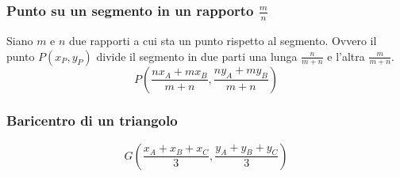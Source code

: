 \subsubsection{Punto su un segmento in un rapporto $\frac{m}{n}$}
Siano $m$ e $n$ due rapporti a cui sta un punto rispetto al segmento. Ovvero il punto $P(x_P, y_P)$
divide il segmento in due parti una lunga $\frac{n}{m+n}$ e l'altra $\frac{m}{m+n}$.
\begin{equation*}
  P\left(\frac{nx_A+mx_B}{m+n},\frac{ny_A+my_B}{m+n}\right)
\end{equation*}

\subsubsection{Baricentro di un triangolo}
\begin{equation*}
  G\left(\frac{x_A+x_B+x_C}{3},\frac{y_A+y_B+y_C}{3}\right)
\end{equation*}

